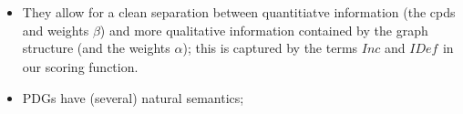 \documentclass[letterpaper]{article} %
\theoremstyle{plain}
\theoremstyle{definition}
\theoremstyle{remark}
\newcommand{\IDef}[1]{\mathit{IDef}_{\!#1}}
\newcommand\Inc{\mathit{Inc}}
\begin{document}
\begin{itemize}
{%
retain the same local commitment to the meanings of cpds in the
restriction; this is  
As a result, PDGs exhibit both flexibility and locality, making them
uniquely modular. 
}
\item They allow for a clean separation between quantitiatve
  information (the cpds and weights $\beta$) and more qualitative information contained by
the graph structure (and the weights $\alpha$);
this is captured by the terms $\Inc$ and $\IDef{}$
  in our scoring function.
\item PDGs have (several) natural semantics;

\end{itemize}
\end{document}
